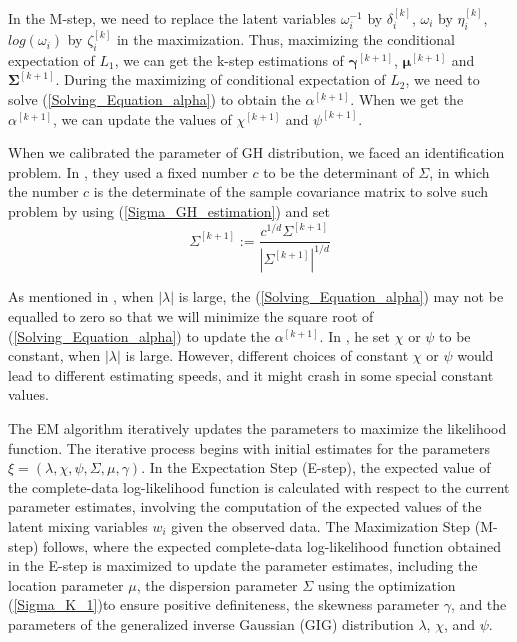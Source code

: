 In the M-step, we need to replace the latent variables $\omega^{-1}_i$ by $\delta^{[k]}_i$, $\omega_i$ by $\eta^{[k]}_i$, $log(\omega_i)$ by $\zeta^{[k]}_i$ in the maximization. Thus, maximizing the conditional expectation of $L_1$, we can get the k-step estimations of $\mathbf{\gamma}^{[k+1]}$, $\mathbf{\mu}^{[k+1]}$ and $\mathbf{\Sigma}^{[k+1]}$. During the maximizing of conditional expectation of $L_2$, we need to solve (\ref{Solving_Equation_alpha}) to obtain the $\alpha^{[k+1]}$. When we get the $\alpha^{[k+1]}$, we can update the values of $\chi^{[k+1]}$ and $\psi^{[k+1]}$. 


When we calibrated the parameter of GH distribution, we faced an identification problem. In \cite{Mcneil_A_J_And_Frey_R_And_Embrechts_P_2015}, they used a fixed number $c$ to be the determinant of $\Sigma$, in which the number $c$ is the determinate of the sample covariance matrix to solve such problem by using (\ref{Sigma_GH_estimation}) and set
\begin{equation}\label{Sigma_K_1}
    \Sigma^{[k+1]}:=\frac{c^{1 / d} \Sigma^{[k+1]}}{\left|\Sigma^{[k+1]}\right|^{1 / d}}
\end{equation}

As mentioned in \cite{Hu_Wenbo_2005}, when $|\lambda|$ is large, the (\ref{Solving_Equation_alpha}) may not be equalled to zero so that we will minimize the square root of (\ref{Solving_Equation_alpha}) to update the $\alpha^{[k+1]}$. In \cite{Hu_Wenbo_2005}, he set $\chi$ or $\psi$ to be constant, when $|\lambda|$ is large. However, different choices of constant $\chi$ or $\psi$ would lead to different estimating speeds, and it might crash in some special constant values. 

The EM algorithm iteratively updates the parameters to maximize the likelihood function. The iterative process begins with initial estimates for the parameters \(\xi = (\lambda, \chi, \psi, \Sigma, \mu, \gamma)\). In the Expectation Step (E-step), the expected value of the complete-data log-likelihood function is calculated with respect to the current parameter estimates, involving the computation of the expected values of the latent mixing variables \(w_i\) given the observed data. The Maximization Step (M-step) follows, where the expected complete-data log-likelihood function obtained in the E-step is maximized to update the parameter estimates, including the location parameter \(\mu\), the dispersion parameter \(\Sigma\) using the optimization (\ref{Sigma_K_1})to ensure positive definiteness, the skewness parameter \(\gamma\), and the parameters of the generalized inverse Gaussian (GIG) distribution \(\lambda\), \(\chi\), and \(\psi\). 

